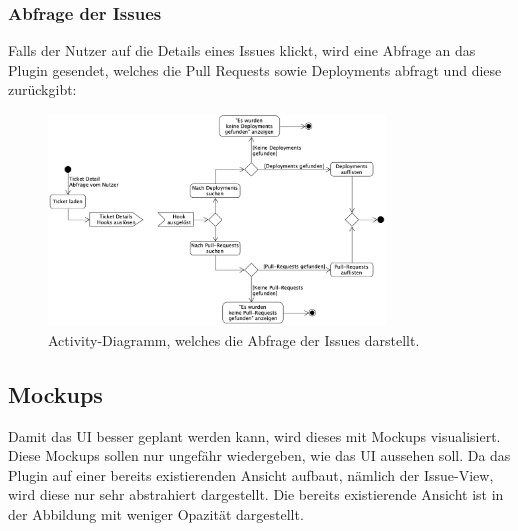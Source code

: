 \subsubsection{Abfrage der Issues}
Falls der Nutzer auf die Details eines Issues klickt, wird eine Abfrage an das Plugin gesendet, welches die Pull Requests sowie
Deployments abfragt und diese zurückgibt:
\begin{figure}[H]
  \centering
  \includegraphics[width=0.8\textwidth]{images/activity/issues-view.png}
  \caption[Activity-Diagramm, welches die Abfrage der Issues darstellt.]{Activity-Diagramm, welches die Abfrage der Issues darstellt.}
  \label{fig:activity_issues}
\end{figure}

\subsection{Mockups}
\label{sec:mockups}
Damit das UI besser geplant werden kann, wird dieses mit Mockups visualisiert. Diese Mockups sollen
nur ungefähr wiedergeben, wie das UI aussehen soll. Da das Plugin auf einer bereits existierenden 
Ansicht aufbaut, nämlich der Issue-View, wird diese nur sehr abstrahiert dargestellt. \newline
Die bereits existierende Ansicht ist in der Abbildung mit weniger Opazität dargestellt.

\newpage
